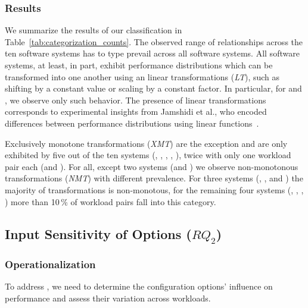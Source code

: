 {{\subsubsection{Results}
{\color{edited}
We summarize the results of our classification in Table~\ref{tab:categorization_counts}. The observed range of relationships across the ten software systems has to type prevail across all software systems. 
All software systems, at least, in part, exhibit performance distributions which can be transformed into one another using an linear transformations (\textit{\colorbox{lt-color}{LT}}), such as shifting by a constant value or scaling by a constant factor. In particular, for \jumper and \xzwo, we observe only such behavior. The presence of linear transformations corresponds to experimental insights from Jamshidi et al., who encoded differences between performance distributions using linear functions~\cite{jamishidi_transfer_2017}.

Exclusively monotone transformations (\textit{\colorbox{xmt-color}{XMT}}) are the exception and are only exhibited by five out of the ten systems (\kanzi, \batik, \xz, \lrzip, \zdrei), twice with only one workload pair each (\xz and \zdrei).  
For all, except two systems (\jumper and \xzwo) we observe non-monotonous transformations (\textit{\colorbox{nmt-color}{NMT}}) with different prevalence.  For three systems (\dconvert, \htwo, and \zdrei) the majority of transformations is non-monotous, for the remaining four systems (\kanzi, \batik, \xz, \lrzip) more than 10\,\% of workload pairs fall into this category.

\vspace{1mm}

\subsection{Input Sensitivity of Options ($RQ_2$)}\label{sec:rq2}

\subsubsection{Operationalization}
To address , we need to determine the configuration options’ influence on performance and assess their variation across workloads. 

}}}
